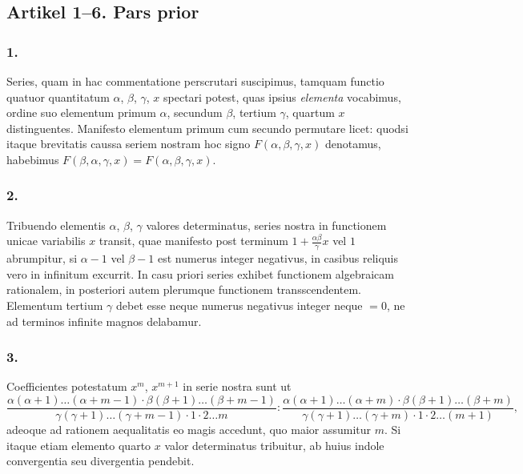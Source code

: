 \documentclass[12pt,a4paper]{article}
\newcommand{\1}{\ensuremath{\mathrlap{\,|\,}}} %
\begin{document}
\bigskip

\subsection*{Artikel 1--6. Pars prior}

\subsubsection*{1.}
Series, quam in hac commentatione perscrutari suscipimus, tamquam functio quatuor quantitatum $\alpha$, $\beta$, $\gamma$, $x$ spectari potest, quas ipsius \textit{elementa} vocabimus, ordine suo elementum primum $\alpha$, secundum $\beta$, tertium $\gamma$, quartum $x$ distinguentes. Manifesto elementum primum cum secundo permutare licet: quodsi itaque brevitatis caussa seriem nostram hoc signo $F(\alpha, \beta, \gamma, x)$ denotamus, habebimus $F(\beta, \alpha, \gamma, x) = F(\alpha, \beta, \gamma, x)$.

\subsubsection*{2.}
Tribuendo elementis $\alpha$, $\beta$, $\gamma$ valores determinatus, series nostra in functionem unicae variabilis $x$ transit, quae manifesto post terminum $1 + \frac{\alpha\beta}{\gamma}x$ vel $1$ abrumpitur, si $\alpha - 1$ vel $\beta - 1$ est numerus integer negativus, in casibus reliquis vero in infinitum excurrit. In casu priori series exhibet functionem algebraicam rationalem, in posteriori autem plerumque functionem transscendentem. Elementum tertium $\gamma$ debet esse neque numerus negativus integer neque $= 0$, ne ad terminos infinite magnos delabamur.

\subsubsection*{3.}
Coefficientes potestatum $x^m$, $x^{m+1}$ in serie nostra sunt ut
\[\frac{\alpha(\alpha+1)\ldots(\alpha+m-1)\cdot\beta(\beta+1)\ldots(\beta+m-1)}{\gamma(\gamma+1)\ldots(\gamma+m-1)\cdot 1\cdot 2\ldots m} : \frac{\alpha(\alpha+1)\ldots(\alpha+m)\cdot\beta(\beta+1)\ldots(\beta+m)}{\gamma(\gamma+1)\ldots(\gamma+m)\cdot 1\cdot 2\ldots(m+1)},\]
adeoque ad rationem aequalitatis eo magis accedunt, quo maior assumitur $m$. Si itaque etiam elemento quarto $x$ valor determinatus tribuitur, ab huius indole convergentia seu divergentia pendebit.
\end{document}
